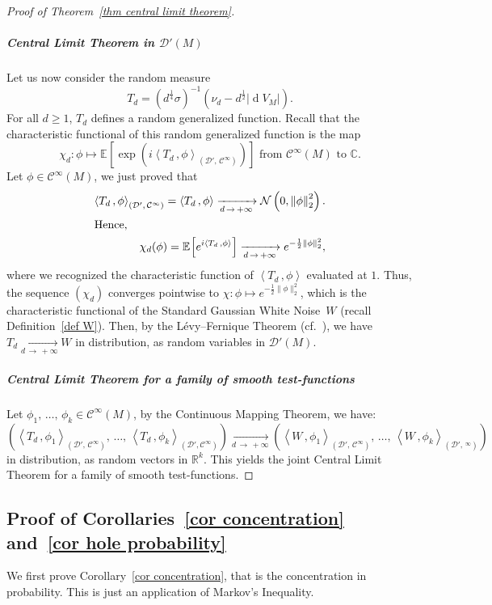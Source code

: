\documentclass[10pt]{amsart}
\theoremstyle{definition}\newtheorem{defi}[theo]{Definition}\newtheorem{rema}[theo]{Remark}\newtheorem{exam}[theo]{Example}\newtheorem{exem}[theo]{Example}\newtheorem{nota}[theo]{Notation}
\DeclareMathOperator{\dmesure}{d}
\newcommand{\D}{\mathcal{D}}
\newcommand{\clN}{\mathcal{N}}
\newcommand{\clC}{\mathcal{C}}
\newcommand{\C}{\mathbb{C}}
\newcommand{\R}{\mathbb{R}}
\newcommand{\esp}[2][]{\mathbb{E}_{#1}\!\left[#2 \right]}
\newcommand{\norm}[1]{\left\lvert #1 \right\rvert}
\newcommand{\Norm}[1]{\left\lVert #1 \right\rVert}
\newcommand{\prsc}[2]{\left\langle #1\,, #2 \right\rangle}
\newcommand{\rmes}[1]{\norm{\dmesure\! V_{#1}}}
\renewcommand{\geq}{\geqslant}
\begin{document}
\begin{proof}[{Proof of Theorem~\ref{thm central limit theorem}}]
\subparagraph*{Central Limit Theorem in $\D'(M)$}
Let us now consider the random measure
\[
T_d = \left(d^\frac{1}{4}\sigma\right)^{-1} \left(\nu_d - d^\frac{1}{2}\rmes{M}\right).
\]
For all $d \geq 1$, $T_d$ defines a random generalized function. Recall that the characteristic functional of this random generalized function is the map
\[
\chi_d :\phi \mapsto \esp{\exp\left(i\prsc{T_d}{\phi}_{\left(\D',\,\clC^\infty\right)}\right)}\text{ from }\clC^\infty(M)\text{ to }\C.
\]
Let $\phi \in \clC^\infty(M)$, we just proved that
\begin{align*}
\prsc{T_d}{\phi}_{\left(\D',\,\clC^\infty\right)} = \prsc{T_d}{\phi} \xrightarrow[d\,\to\,+\infty]{} \clN\left(0,\Norm{\phi}_2^2\right).
\\
\intertext{Hence,}
\chi_d(\phi) = \esp{e^{i\prsc{T_d}{\phi}}} \xrightarrow[d \,\to \,+\infty]{} e^{-\frac{1}{2}\Norm{\phi}_2^2},
\end{align*}
where we recognized the characteristic function of $\prsc{T_d}{\phi}$ evaluated at $1$. Thus, the sequence $(\chi_d)$ converges pointwise to $\chi:\phi \mapsto e^{-\frac{1}{2}\|\phi\|_2^2}$, which is the characteristic functional of the Standard Gaussian White Noise~$W$ (recall Definition~\ref{def W}). Then, by the Lévy--Fernique Theorem (cf.~\cite[Theorem~III.6.5]{Fer1967}), we have $T_d \xrightarrow[d\, \to\,+\infty]{} W$ in distribution, as random variables in $\D'(M)$.

\subparagraph*{Central Limit Theorem for a family of smooth test-functions}
Let $\phi_1,\,\dots,\,\phi_k \in \clC^\infty(M)$, by the Continuous Mapping Theorem, we have:
\[
\left(\prsc{T_d}{\phi_1}_{\left(\D',\,\clC^\infty\right)},\,\dots,\,\prsc{T_d}{\phi_k}_{\left(\D',\clC^\infty\right)}\right) \xrightarrow[d\,\to\,+\infty]{} \left(\prsc{W}{\phi_1}_{\left(\D',\,\clC^\infty\right)},\,\dots,\,\prsc{W}{\phi_k}_{\left(\D',\,^\infty\right)}\right)
\]
in distribution, as random vectors in $\R^k$. This yields the joint Central Limit Theorem for a family of smooth test-functions.
\end{proof}



\subsection{Proof of Corollaries~\ref{cor concentration} and~\ref{cor hole probability}}\label{subsec proof of the corollaries}

We first prove Corollary~\ref{cor concentration}, that is the concentration in probability. This is just an application of Markov's Inequality.
\end{document}
